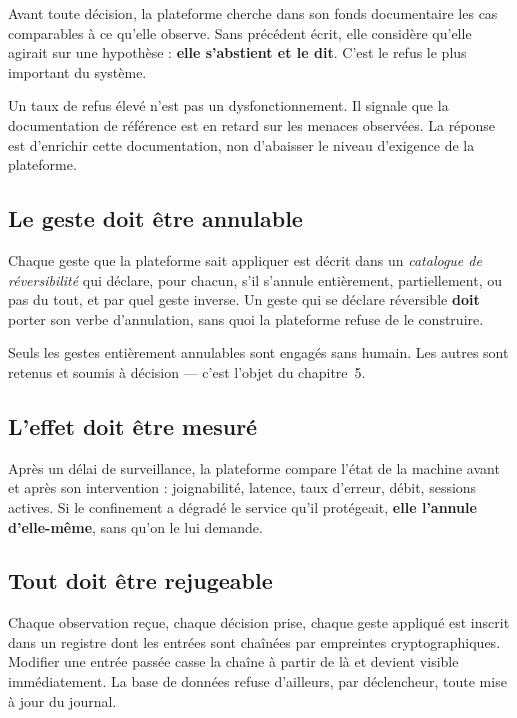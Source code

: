 Avant toute décision, la plateforme cherche dans son fonds documentaire les cas
comparables à ce qu'elle observe. Sans précédent écrit, elle considère qu'elle
agirait sur une hypothèse : \textbf{elle s'abstient et le dit}. C'est le refus
le plus important du système.

\begin{tcolorbox}[colback=green!4!white, colframe=darkgreen,
  title=\textbf{Bon à savoir}, fonttitle=\bfseries, boxrule=0.6pt]
Un taux de refus élevé n'est pas un dysfonctionnement. Il signale que la
documentation de référence est en retard sur les menaces observées. La réponse
est d'enrichir cette documentation, non d'abaisser le niveau d'exigence de la
plateforme.
\end{tcolorbox}

\subsection{Le geste doit être annulable}

Chaque geste que la plateforme sait appliquer est décrit dans un
\emph{catalogue de réversibilité} qui déclare, pour chacun, s'il s'annule
entièrement, partiellement, ou pas du tout, et par quel geste inverse. Un geste
qui se déclare réversible \textbf{doit} porter son verbe d'annulation, sans
quoi la plateforme refuse de le construire.

Seuls les gestes entièrement annulables sont engagés sans humain. Les autres
sont retenus et soumis à décision — c'est l'objet du chapitre~5.

\subsection{L'effet doit être mesuré}

Après un délai de surveillance, la plateforme compare l'état de la machine
avant et après son intervention : joignabilité, latence, taux d'erreur, débit,
sessions actives. Si le confinement a dégradé le service qu'il protégeait,
\textbf{elle l'annule d'elle-même}, sans qu'on le lui demande.

\subsection{Tout doit être rejugeable}

Chaque observation reçue, chaque décision prise, chaque geste appliqué est
inscrit dans un registre dont les entrées sont chaînées par empreintes
cryptographiques. Modifier une entrée passée casse la chaîne à partir de là et
devient visible immédiatement. La base de données refuse d'ailleurs, par
déclencheur, toute mise à jour du journal.

